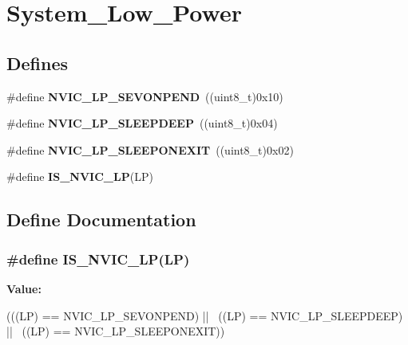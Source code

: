 \hypertarget{group__System__Low__Power}{
\section{System\_\-Low\_\-Power}
\label{group__System__Low__Power}
}
\subsection*{Defines}
\begin{DoxyCompactItemize}
\item 
\hypertarget{group__System__Low__Power_ga10748d2b2875afd122f6476864ad6cae}{
\#define {\bfseries NVIC\_\-LP\_\-SEVONPEND}~((uint8\_\-t)0x10)}
\label{group__System__Low__Power_ga10748d2b2875afd122f6476864ad6cae}

\item 
\hypertarget{group__System__Low__Power_gaeec2d10922fa9ec5e65398667b303253}{
\#define {\bfseries NVIC\_\-LP\_\-SLEEPDEEP}~((uint8\_\-t)0x04)}
\label{group__System__Low__Power_gaeec2d10922fa9ec5e65398667b303253}

\item 
\hypertarget{group__System__Low__Power_ga368dc13a9c762a307c07cfa2e3ef59ad}{
\#define {\bfseries NVIC\_\-LP\_\-SLEEPONEXIT}~((uint8\_\-t)0x02)}
\label{group__System__Low__Power_ga368dc13a9c762a307c07cfa2e3ef59ad}

\item 
\#define {\bfseries IS\_\-NVIC\_\-LP}(LP)
\end{DoxyCompactItemize}


\subsection{Define Documentation}
\hypertarget{group__System__Low__Power_ga985896f03bc1d7b3da17a212f1bc3de9}{
\subsubsection[{IS\_\-NVIC\_\-LP}]{\setlength{\rightskip}{0pt plus 5cm}\#define IS\_\-NVIC\_\-LP(LP)}}
\label{group__System__Low__Power_ga985896f03bc1d7b3da17a212f1bc3de9}
{\bfseries Value:}
\begin{DoxyCode}
(((LP) == NVIC_LP_SEVONPEND) || \
                        ((LP) == NVIC_LP_SLEEPDEEP) || \
                        ((LP) == NVIC_LP_SLEEPONEXIT))
\end{DoxyCode}
